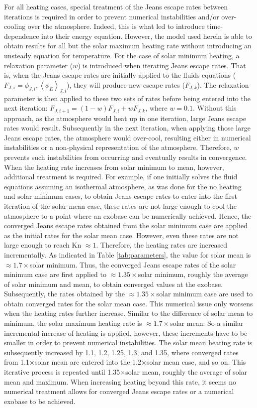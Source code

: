 \documentclass[times,12]{article}
\begin{document}
\indent For all heating cases, special treatment of the Jeans escape rates between iterations is required in order to prevent numerical instabilities and/or over-cooling over the atmosphere. Indeed, this is what led \cite{Erwin2013} to introduce time-dependence into their energy equation. However, the model used herein is able to obtain results for all but the solar maximum heating rate without introducing an unsteady equation for temperature. For the case of solar minimum heating, a relaxation parameter ($w$) is introduced when iterating Jeans escape rates. That is, when the Jeans escape rates are initially applied to the fluids equations ($F_{J,i} = \phi_{J,i}, \left\langle\phi_E\right\rangle_{J,i}$), they will produce new escape rates ($F_{J,k}$). The relaxation parameter is then applied to these two sets of rates before being entered into the next iteration: $F_{J,i+1} = (1-w) F_{J,i} + w F_{J,k}$, where $w=0.1$. Without this approach, as the atmosphere would heat up in one iteration, large Jeans escape rates would result. Subsequently in the next iteration, when applying those large Jeans escape rates, the atmosphere would over-cool, resulting either in numerical instabilities or a non-physical representation of the atmosphere. Therefore, $w$ prevents such instabilities from occurring and eventually results in convergence. When the heating rate increases from solar minimum to mean, however, additional treatment is required. For example, if one initially solves the fluid equations assuming an isothermal atmosphere, as was done for the no heating and solar minimum cases, to obtain Jeans escape rates to enter into the first iteration of the solar mean case, these rates are not large enough to cool the atmosphere to a point where an exobase can be numerically achieved. Hence, the converged Jeans escape rates obtained from the solar minimum case are applied as the initial rates for the solar mean case. However, even these rates are not large enough to reach Kn $\approx1$. Therefore, the heating rates are increased incrementally. As indicated in Table \ref{tab:parameters}, the value for solar mean is $\approx1.7 \times$solar minimum. Thus, the converged Jeans escape rates of the solar minimum case are first applied to $\approx 1.35 \times$solar minimum, roughly the average of solar minimum and mean, to obtain converged values at the exobase. Subsequently, the rates obtained by the $\approx 1.35 \times$solar minimum case are used to obtain converged rates for the solar mean case. This numerical issue only worsens when the heating rates further increase. Similar to the difference of solar mean to minimum, the solar maximum heating rate is $\approx 1.7 \times$solar mean. So a similar incremental increase of heating is applied, however, these increments have to be smaller in order to prevent numerical instabilities. The solar mean heating rate is subsequently increased by 1.1, 1.2, 1.25, 1.3, and 1.35, where converged rates from 1.1$\times$solar mean are entered into the 1.2$\times$solar mean case, and so on. This iterative process is repeated until 1.35$\times$solar mean, roughly the average of solar mean and maximum. When increasing heating beyond this rate, it seems no numerical treatment allows for converged Jeans escape rates or a numerical exobase to be achieved.\\
\end{document}
